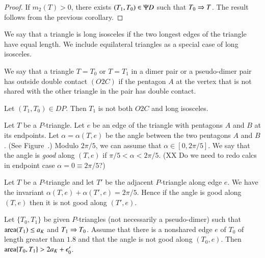 \begin{proof} If $m_2(T)>0$, there exists $(T_1,T_0)\in\Psi D$ such that $T_0\Rightarrow T$.
The result follows from the previous corollary.
\end{proof}


\begin{definition}
We say that a triangle is long isosceles if the two longest edges of the triangle have
equal length.  We include equilateral triangles as a special case of long isosceles.
\end{definition}

\begin{definition}[O2C]
We say that a triangle $T=T_0$ or $T=T_1$ in a dimer pair or a pseudo-dimer pair has outside double
contact $(O2C)$ if the pentagon $A$ at the vertex that is not shared with the other triangle in the pair
has double contact.
\end{definition}

\begin{lemma}
Let $(T_1,T_0)\in DP$.  Then $T_1$ is not both $O2C$  and long isosceles.
\end{lemma}

\begin{definition}  Let $T$ be a $P$-triangle.  Let $e$ be an edge of the triangle with pentagons
$A$ and $B$ at its endpoints.
Let $\alpha = \alpha(T,e)$ be the angle between the two pentagons $A$ and $B$.  (See Figure~.)  Modulo
$2\pi/5$, we can assume that $\alpha\in  [0,2\pi/5]$.  We say that the angle is {\it good} along $(T,e)$ if $\pi/5<\alpha < 2\pi/5$.
(XX Do we need to redo calcs in endpoint case $\alpha = 0 \equiv 2\pi/5$?)
\end{definition}


Let $T$ be a $P$-triangle and let $T'$ be the adjacent $P$-triangle along edge $e$.  
We have the invariant $\alpha(T,e)+\alpha(T',e)=2\pi/5$.
Hence if the angle is good along $(T,e)$ then it is not good along $(T',e)$.


\begin{lemma}
Let $\{T_0,T_1\}$ be given $P$-triangles (not necessarily a pseudo-dimer) such that ${\operatorname{area}}(T_1)\le a_K$ and $T_1\Rightarrow T_0$.
Assume that there is a nonshared edge $e$ of $T_0$ of length greater than $1.8$ and that the angle is not good along $(T_0,e)$.
Then ${\operatorname{area}}\{T_0,T_1\} > 2a_K + \epsilon_0'$.
\end{lemma}

